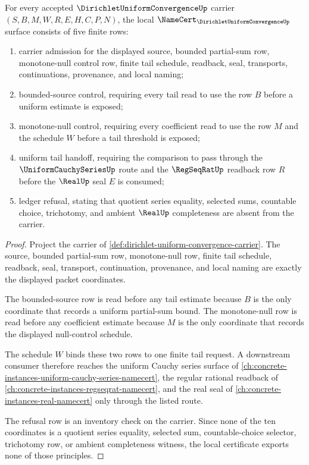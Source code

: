 \begin{theorem}\label{thm:dirichlet-uniform-convergence-namecert-obligation-surface}
For every accepted $\DirichletUniformConvergenceUp$ carrier $(S,B,M,W,R,E,H,C,P,N)$, the local $\NameCert_{\DirichletUniformConvergenceUp}$ surface consists of five finite rows:
\begin{enumerate}
\item carrier admission for the displayed source, bounded partial-sum row, monotone-null control row, finite tail schedule, readback, seal, transports, continuations, provenance, and local naming;
\item bounded-source control, requiring every tail read to use the row $B$ before a uniform estimate is exposed;
\item monotone-null control, requiring every coefficient read to use the row $M$ and the schedule $W$ before a tail threshold is exposed;
\item uniform tail handoff, requiring the comparison to pass through the $\UniformCauchySeriesUp$ route and the $\RegSeqRatUp$ readback row $R$ before the $\RealUp$ seal $E$ is consumed;
\item ledger refusal, stating that quotient series equality, selected sums, countable choice, trichotomy, and ambient $\RealUp$ completeness are absent from the carrier.
\end{enumerate}
\end{theorem}
\begin{proof}
Project the carrier of \autoref{def:dirichlet-uniform-convergence-carrier}. The source, bounded partial-sum row, monotone-null row, finite tail schedule, readback, seal, transport, continuation, provenance, and local naming are exactly the displayed packet coordinates.

The bounded-source row is read before any tail estimate because $B$ is the only coordinate that records a uniform partial-sum bound. The monotone-null row is read before any coefficient estimate because $M$ is the only coordinate that records the displayed null-control schedule.

The schedule $W$ binds these two rows to one finite tail request. A downstream consumer therefore reaches the uniform Cauchy series surface of \autoref{ch:concrete-instances-uniform-cauchy-series-namecert}, the regular rational readback of \autoref{ch:concrete-instances-regseqrat-namecert}, and the real seal of \autoref{ch:concrete-instances-real-namecert} only through the listed route.

The refusal row is an inventory check on the carrier. Since none of the ten coordinates is a quotient series equality, selected sum, countable-choice selector, trichotomy row, or ambient completeness witness, the local certificate exports none of those principles.
\end{proof}


